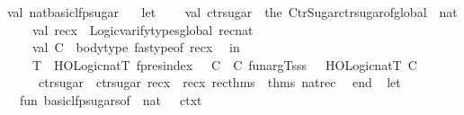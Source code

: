 \begin{isabellebody}
val\ nat{\isacharunderscore}{\kern0pt}basic{\isacharunderscore}{\kern0pt}lfp{\isacharunderscore}{\kern0pt}sugar\ {\isacharequal}{\kern0pt}\isanewline
\ \ let\isanewline
\ \ \ \ val\ ctr{\isacharunderscore}{\kern0pt}sugar\ {\isacharequal}{\kern0pt}\ the\ {\isacharparenleft}{\kern0pt}Ctr{\isacharunderscore}{\kern0pt}Sugar{\isachardot}{\kern0pt}ctr{\isacharunderscore}{\kern0pt}sugar{\isacharunderscore}{\kern0pt}of{\isacharunderscore}{\kern0pt}global\ \isactrltheory \ \isactrltypeUNDERSCOREname {\isasymopen}nat{\isasymclose}{\isacharparenright}{\kern0pt}{\isacharsemicolon}{\kern0pt}\isanewline
\ \ \ \ val\ recx\ {\isacharequal}{\kern0pt}\ Logic{\isachardot}{\kern0pt}varify{\isacharunderscore}{\kern0pt}types{\isacharunderscore}{\kern0pt}global\ \isactrlterm {\isasymopen}rec{\isacharunderscore}{\kern0pt}nat{\isasymclose}{\isacharsemicolon}{\kern0pt}\isanewline
\ \ \ \ val\ C\ {\isacharequal}{\kern0pt}\ body{\isacharunderscore}{\kern0pt}type\ {\isacharparenleft}{\kern0pt}fastype{\isacharunderscore}{\kern0pt}of\ recx{\isacharparenright}{\kern0pt}{\isacharsemicolon}{\kern0pt}\isanewline
\ \ in\isanewline
\ \ \ \ {\isacharbraceleft}{\kern0pt}T\ {\isacharequal}{\kern0pt}\ HOLogic{\isachardot}{\kern0pt}natT{\isacharcomma}{\kern0pt}\ fp{\isacharunderscore}{\kern0pt}res{\isacharunderscore}{\kern0pt}index\ {\isacharequal}{\kern0pt}\ {}{\isacharcomma}{\kern0pt}\ C\ {\isacharequal}{\kern0pt}\ C{\isacharcomma}{\kern0pt}\ fun{\isacharunderscore}{\kern0pt}arg{\isacharunderscore}{\kern0pt}Tsss\ {\isacharequal}{\kern0pt}\ {\isacharbrackleft}{\kern0pt}{\isacharbrackleft}{\kern0pt}{\isacharbrackright}{\kern0pt}{\isacharcomma}{\kern0pt}\ {\isacharbrackleft}{\kern0pt}{\isacharbrackleft}{\kern0pt}HOLogic{\isachardot}{\kern0pt}natT{\isacharcomma}{\kern0pt}\ C{\isacharbrackright}{\kern0pt}{\isacharbrackright}{\kern0pt}{\isacharbrackright}{\kern0pt}{\isacharcomma}{\kern0pt}\isanewline
\ \ \ \ \ ctr{\isacharunderscore}{\kern0pt}sugar\ {\isacharequal}{\kern0pt}\ ctr{\isacharunderscore}{\kern0pt}sugar{\isacharcomma}{\kern0pt}\ recx\ {\isacharequal}{\kern0pt}\ recx{\isacharcomma}{\kern0pt}\ rec{\isacharunderscore}{\kern0pt}thms\ {\isacharequal}{\kern0pt}\ {\isacharat}{\kern0pt}{\isacharbraceleft}{\kern0pt}thms\ nat{\isachardot}{\kern0pt}rec{\isacharbraceright}{\kern0pt}{\isacharbraceright}{\kern0pt}\isanewline
\ \ end{\isacharsemicolon}{\kern0pt}\isanewline
{\isacartoucheclose}\isanewline
\isanewline
{}\isamarkupfalse%
\ {\isacartoucheopen}\isanewline
let\isanewline
\ \ fun\ basic{\isacharunderscore}{\kern0pt}lfp{\isacharunderscore}{\kern0pt}sugars{\isacharunderscore}{\kern0pt}of\ {\isacharunderscore}{\kern0pt}\ {\isacharbrackleft}{\kern0pt}\isactrltyp {\isasymopen}nat{\isasymclose}{\isacharbrackright}{\kern0pt}\ {\isacharunderscore}{\kern0pt}\ {\isacharunderscore}{\kern0pt}\ ctxt\ {\isacharequal}{\kern0pt}\isanewline

\end{isabellebody}
